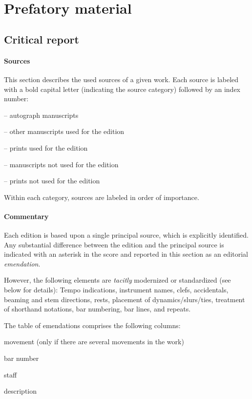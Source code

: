 \documentclass[abbrwidth=7em,shorttitlesize=55]{ees}
\begin{document}
\section*{Prefatory material}

\subsection{Critical report}

\paragraph{Sources}
This section describes the used sources of a given work. Each source is labeled with a bold capital letter (indicating the source category) followed by an index number:
\begin{bulletlist}
  \item \A{} – autograph manuscripts
  \item \B{} – other manuscripts used for the edition
  \item \C{} – prints used for the edition
  \item \D{} – manuscripts not used for the edition
  \item \E{} – prints not used for the edition
\end{bulletlist}

Within each category, sources are labeled in order of importance.

\paragraph{Commentary}
Each edition is based upon a single principal source, which is explicitly identified. Any substantial difference between the edition and the principal source is indicated with an asterisk in the score and reported in this section as an editorial \textit{emendation}.

However, the following elements are \textit{tacitly} modernized or standardized (see below for details): Tempo indications, instrument names, clefs, accidentals, beaming and stem directions, rests, placement of dynamics/slurs/ties, treatment of shorthand notations, bar numbering, bar lines, and repeats.

The table of emendations comprises the following columns:
\begin{bulletlist}
  \item movement (only if there are several movements in the work)
  \item bar number
  \item staff
  \item description
\end{bulletlist}
\end{document}
